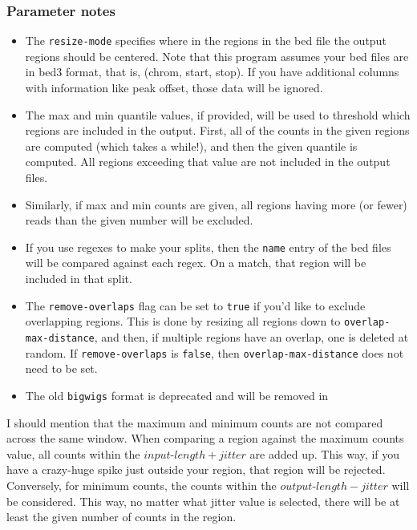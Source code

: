 \documentclass{article}
\begin{document}
\subsubsection{Parameter notes}

\begin{itemize}
    \item The \texttt{resize-mode} specifies where in the regions in the bed file the output
        regions should be centered. Note that this program assumes your bed files are in bed3
        format, that is, (chrom, start, stop). If you have additional columns with information
        like peak offset, those data will be ignored.
    \item The max and min quantile values, if provided, will be used to threshold which regions
        are included in the output. First, all of the counts in the given regions are computed
        (which takes a while!), and then the given quantile is computed. All regions exceeding
        that value are not included in the output files.
    \item Similarly, if max and min counts are given, all regions having more (or fewer) reads
        than the given number will be excluded.
    \item If you use regexes to make your splits, then the \texttt{name} entry of the bed files
        will be compared against each regex.
        On a match, that region will be included in that split.
    \item The \texttt{remove-overlaps} flag can be set to \texttt{true} if you'd like to exclude
        overlapping regions. This is done by resizing all regions down to
        \texttt{overlap-max-distance}, and then, if multiple regions have an overlap,
        one is deleted at random.
        If \texttt{remove-overlaps} is \texttt{false}, then \texttt{overlap-max-distance}
        does not need to be set.
    \item The old \texttt{bigwigs} format is deprecated and will be removed in \label{dep:oldbigwigs}
\end{itemize}

I should mention that the maximum and minimum counts are not compared across the same window.
When comparing a region against the maximum counts value, all counts within the
$input\mbox{-}length + jitter$ are added up. This way, if you have a crazy-huge spike just outside
your region, that region will be rejected.
Conversely, for minimum counts, the counts within the $output\mbox{-}length - jitter$ will be
considered. This way, no matter what jitter value is selected, there will be at least the
given number of counts in the region.
\end{document}
